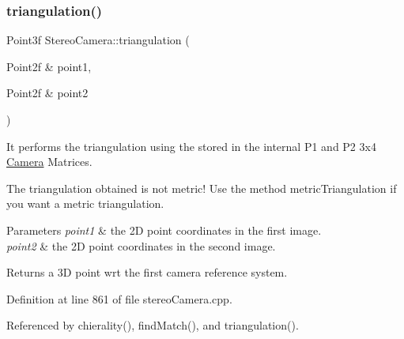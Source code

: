\subsubsection{\texorpdfstring{triangulation()}{triangulation()}\hspace{0.1cm}{\footnotesize\ttfamily [1/2]}}
{\footnotesize\ttfamily Point3f Stereo\+Camera\+::triangulation (\begin{DoxyParamCaption}\item[{Point2f \&}]{point1,  }\item[{Point2f \&}]{point2 }\end{DoxyParamCaption})}



It performs the triangulation using the stored in the internal P1 and P2 3x4 \hyperlink{classCamera}{Camera} Matrices. 

The triangulation obtained is not metric! Use the method metric\+Triangulation if you want a metric triangulation. 
\begin{DoxyParams}{Parameters}
{\em point1} & the 2D point coordinates in the first image. \\
\hline
{\em point2} & the 2D point coordinates in the second image. \\
\hline
\end{DoxyParams}
\begin{DoxyReturn}{Returns}
a 3D point wrt the first camera reference system. 
\end{DoxyReturn}


Definition at line 861 of file stereo\+Camera.\+cpp.



Referenced by chierality(), find\+Match(), and triangulation().


